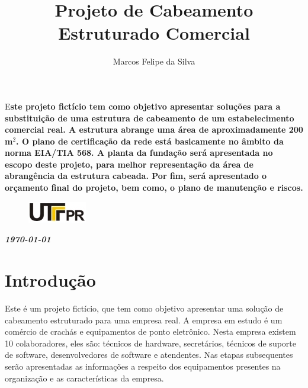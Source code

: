 \documentclass[	DIV=calc,%
							paper=a4,%
							fontsize=12pt,%
							onecolumn]{scrartcl}	 					%
\title{Projeto de Cabeamento Estruturado Comercial}					%
\author{Marcos Felipe da Silva }  	%
\date{}																				%
\newcommand{\initial}[1]{%
     \lettrine[lines=3,lhang=0.3,nindent=0em]{
     				\color{DarkGoldenrod}
     				{\textsf{#1}}}{}}
\begin{document}
\maketitle
\thispagestyle{fancy} 	
\thispagestyle{empty}		%





\initial{E}\textbf{ste projeto fictício tem como objetivo apresentar soluções para a substituição de uma estrutura de cabeamento de um estabelecimento comercial real. A estrutura abrange uma área de aproximadamente 200 m$^{2}$. O plano de certificação da rede está basicamente no âmbito da norma EIA/TIA 568.  A planta da fundação será apresentada no escopo deste projeto, para melhor representação da área de abrangência da estrutura cabeada. Por fim, será apresentado o orçamento final do projeto, bem como, o plano de manutenção e riscos.}


\begin{figure}
	\centering
	\includegraphics{utfpr}
\end{figure}

\vspace{2cm}
\centerline{\textit{\textbf{\today}}}

\clearpage
    \renewcommand*\listfigurename{Lista de figuras}
\listoffigures

\renewcommand*\listtablename{Lista de tabelas}
\listoftables




\clearpage
\renewcommand{\contentsname}{Sumário}
\tableofcontents
\clearpage

\section{Introdução}

Este é um projeto fictício, que tem como objetivo apresentar uma solução de cabeamento estruturado para uma empresa real. A empresa em estudo é um comércio de crachás e equipamentos de ponto eletrônico. Nesta empresa existem 10 colaboradores, eles são: técnicos de hardware, secretários, técnicos de suporte de software, desenvolvedores de software e atendentes. Nas etapas subsequentes serão apresentadas as informações a respeito dos equipamentos presentes na organização e as características da empresa.
\end{document}
